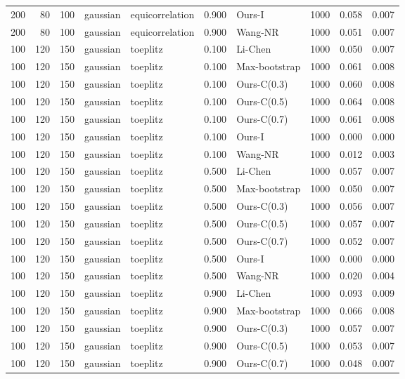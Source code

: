 \begin{tabular}{rrrllrlrrr}
200 & 80 & 100 & gaussian & equicorrelation & 0.900 & Ours-I & 1000 & 0.058 & 0.007 \\
200 & 80 & 100 & gaussian & equicorrelation & 0.900 & Wang-NR & 1000 & 0.051 & 0.007 \\
100 & 120 & 150 & gaussian & toeplitz & 0.100 & Li-Chen & 1000 & 0.050 & 0.007 \\
100 & 120 & 150 & gaussian & toeplitz & 0.100 & Max-bootstrap & 1000 & 0.061 & 0.008 \\
100 & 120 & 150 & gaussian & toeplitz & 0.100 & Ours-C(0.3) & 1000 & 0.060 & 0.008 \\
100 & 120 & 150 & gaussian & toeplitz & 0.100 & Ours-C(0.5) & 1000 & 0.064 & 0.008 \\
100 & 120 & 150 & gaussian & toeplitz & 0.100 & Ours-C(0.7) & 1000 & 0.061 & 0.008 \\
100 & 120 & 150 & gaussian & toeplitz & 0.100 & Ours-I & 1000 & 0.000 & 0.000 \\
100 & 120 & 150 & gaussian & toeplitz & 0.100 & Wang-NR & 1000 & 0.012 & 0.003 \\
100 & 120 & 150 & gaussian & toeplitz & 0.500 & Li-Chen & 1000 & 0.057 & 0.007 \\
100 & 120 & 150 & gaussian & toeplitz & 0.500 & Max-bootstrap & 1000 & 0.050 & 0.007 \\
100 & 120 & 150 & gaussian & toeplitz & 0.500 & Ours-C(0.3) & 1000 & 0.056 & 0.007 \\
100 & 120 & 150 & gaussian & toeplitz & 0.500 & Ours-C(0.5) & 1000 & 0.057 & 0.007 \\
100 & 120 & 150 & gaussian & toeplitz & 0.500 & Ours-C(0.7) & 1000 & 0.052 & 0.007 \\
100 & 120 & 150 & gaussian & toeplitz & 0.500 & Ours-I & 1000 & 0.000 & 0.000 \\
100 & 120 & 150 & gaussian & toeplitz & 0.500 & Wang-NR & 1000 & 0.020 & 0.004 \\
100 & 120 & 150 & gaussian & toeplitz & 0.900 & Li-Chen & 1000 & 0.093 & 0.009 \\
100 & 120 & 150 & gaussian & toeplitz & 0.900 & Max-bootstrap & 1000 & 0.066 & 0.008 \\
100 & 120 & 150 & gaussian & toeplitz & 0.900 & Ours-C(0.3) & 1000 & 0.057 & 0.007 \\
100 & 120 & 150 & gaussian & toeplitz & 0.900 & Ours-C(0.5) & 1000 & 0.053 & 0.007 \\
100 & 120 & 150 & gaussian & toeplitz & 0.900 & Ours-C(0.7) & 1000 & 0.048 & 0.007 \\

\end{tabular}
